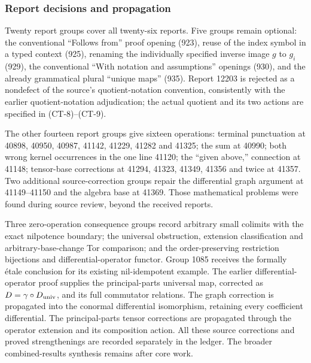 \subsubsection{Report decisions and propagation}\label{algebra-proof-055-report-decisions-and-propagation}

Twenty report groups cover all twenty-six reports. Five groups remain optional: the conventional ``Follows from'' proof opening (923), reuse of the index symbol in a typed context (925), renaming the individually specified inverse image \(g\) to \(g_i\) (929), the conventional ``With notation and assumptions'' openings (930), and the already grammatical plural ``unique maps'' (935). Report 12203 is rejected as a nondefect of the source's quotient-notation convention, consistently with the earlier quotient-notation adjudication; the actual quotient and its two actions are specified in (CT-8)--(CT-9).

The other fourteen report groups give sixteen operations: terminal punctuation at 40898, 40950, 40987, 41142, 41229, 41282 and 41325; the sum at 40990; both wrong kernel occurrences in the one line 41120; the ``given above,'' connection at 41148; tensor-base corrections at 41294, 41323, 41349, 41356 and twice at 41357. Two additional source-correction groups repair the differential graph argument at 41149--41150 and the algebra base at 41369. Those mathematical problems were found during source review, beyond the received reports.

Three zero-operation consequence groups record arbitrary small colimits with the exact nilpotence boundary; the universal obstruction, extension classification and arbitrary-base-change Tor comparison; and the order-preserving restriction bijections and differential-operator functor. Group 1085 receives the formally étale conclusion for its existing nil-idempotent example. The earlier differential-operator proof supplies the principal-parts universal map, corrected as \(D=\gamma\circ D_{\rm univ}\), and its full commutator relations. The graph correction is propagated into the conormal differential isomorphism, retaining every coefficient differential. The principal-parts tensor corrections are propagated through the operator extension and its composition action. All these source corrections and proved strengthenings are recorded separately in the ledger. The broader combined-results synthesis remains after core work.
